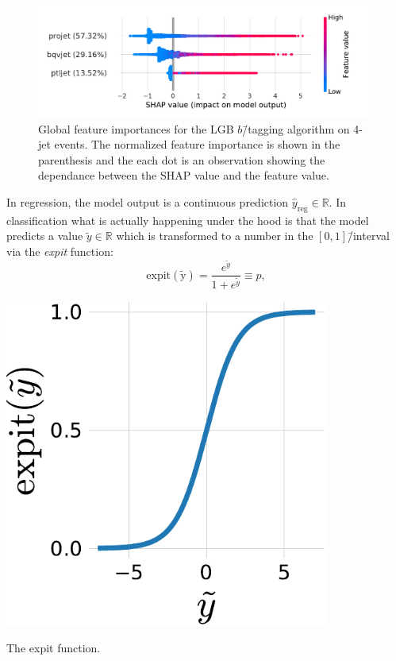 \begin{figure}[h!]
  \centerfloat
  \includegraphics[width=0.98\textwidth, trim=10 10 20 10, clip]{figures/quarks/shap_global-down_sample=1.00-ML_vars=vertex-selection=b-ejet_min=4-n_iter_RS_lgb=99-n_iter_RS_xgb=9-cdot_cut=0.90-version=19-njet=4.pdf}
  \caption[Global Feature Importances for the LGB $b$\=/Tagging Algorithm on 4-Jet Events]
          {Global feature importances for the LGB $b$\=/tagging algorithm on 4-jet events. The normalized feature importance is shown in the parenthesis and the each dot is an observation showing the dependance between the SHAP value and the feature value. 
          } 
  \label{fig:q:shap_btag_global_4j}
\end{figure}



In regression, the model output is a continuous prediction ${\hat{y}_\mathrm{reg} \in \mathbb{R}}$. In classification what is actually happening under the hood is that the model predicts a value $\tilde{y} \in \mathbb{R}$ which is transformed to a number in the $[0, 1]$\=/interval via the \emph{expit} function:
\begin{equation}
    \label{eq:q:expit}
    \mathrm{expit(\tilde{y})} = \frac{e^{\tilde{y}}}{1+e^{\tilde{y}}} \equiv p,
\end{equation}

\begin{marginfigure}[-2.5cm]
  \centerfloat
  \includegraphics[width=0.8\textwidth]{figures/logit_expit/expit.pdf}
  \caption[The Expit Function]
          {The expit function.} 
  \label{fig:q:expit}
\end{marginfigure}

